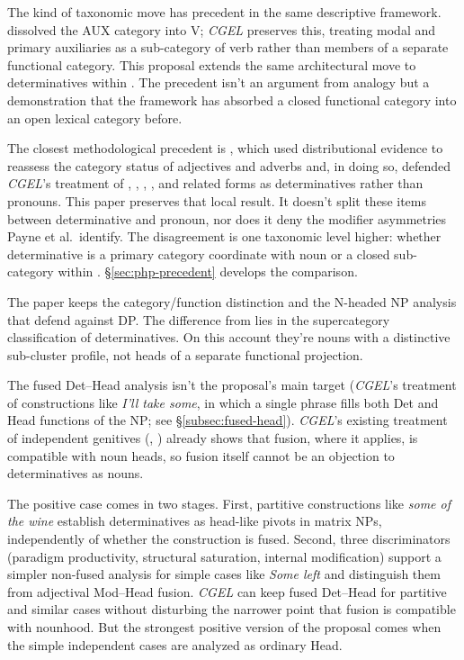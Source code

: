 \documentclass[12pt]{article}
\begin{document}
The kind of taxonomic move has precedent in the same descriptive framework. \textcite{pullumwilson1977} dissolved the AUX category into V; \textit{CGEL} preserves this, treating modal and primary auxiliaries as a sub-category of verb rather than members of a separate functional category. This proposal extends the same architectural move to determinatives within . The precedent isn't an argument from analogy but a demonstration that the framework has absorbed a closed functional category into an open lexical category before.

The closest methodological precedent is \textcite{payne2010}, which used distributional evidence to reassess the category status of adjectives and adverbs and, in doing so, defended \textit{CGEL}'s treatment of , , , , and related forms as determinatives rather than pronouns. This paper preserves that local result. It doesn't split these items between determinative and pronoun, nor does it deny the modifier asymmetries Payne et al.\ identify. The disagreement is one taxonomic level higher: whether determinative is a primary category coordinate with noun or a closed sub-category within . §\ref{sec:php-precedent} develops the comparison.

The paper keeps the category/function distinction and the N-headed NP analysis that \textcite{pullummiller2022nps} defend against DP. The difference from \textcite{abney1987} lies in the supercategory classification of determinatives. On this account they're nouns with a distinctive sub-cluster profile, not heads of a separate functional projection.

The fused Det--Head analysis isn't the proposal's main target (\textit{CGEL}'s treatment of constructions like \textit{I'll take some}, in which a single phrase fills both Det and Head functions of the NP; see §\ref{subsec:fused-head}). \textit{CGEL}'s existing treatment of independent genitives (, ) already shows that fusion, where it applies, is compatible with noun heads, so fusion itself cannot be an objection to determinatives as nouns.

The positive case comes in two stages. First, partitive constructions like \textit{some of the wine} establish determinatives as head-like pivots in matrix NPs, independently of whether the construction is fused. Second, three discriminators (paradigm productivity, structural saturation, internal modification) support a simpler non-fused analysis for simple cases like \textit{Some left} and distinguish them from adjectival Mod--Head fusion. \textit{CGEL} can keep fused Det--Head for partitive and similar cases without disturbing the narrower point that fusion is compatible with nounhood. But the strongest positive version of the proposal comes when the simple independent cases are analyzed as ordinary Head.
\end{document}
